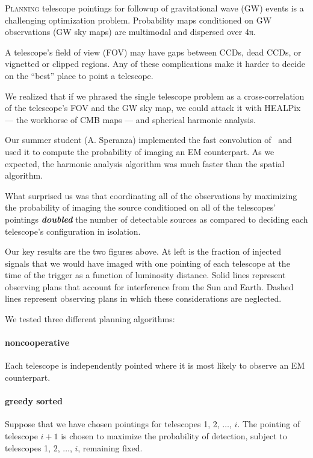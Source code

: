 \documentclass[portrait]{a0poster}
\newcommand{\dropcap}[2]{\lettrine{\fontspec{Copse}#1}{\textnormal{#2}}}
\renewcommand{\emph}[1]{{\bfseries\itshape#1}}
\begin{document}
\dropcap{P}{lanning} telescope pointings for followup of gravitational wave (GW) events is a challenging optimization problem.  Probability maps conditioned on GW observations (GW sky maps) are multimodal and dispersed over 4π.

A telescope’s field of view (FOV) may have gaps between CCDs, dead CCDs, or vignetted or clipped regions.  Any of these complications make it harder to decide on the “best” place to point a telescope.

We realized that if we phrased the single telescope problem as a cross-correlation of the telescope’s FOV and the GW sky map, we could attack it with HEALPix --- the workhorse of CMB maps --- and spherical harmonic analysis.

Our summer student (A. Speranza) implemented the fast convolution of~\citet{Wandelt:2001p13439} and used it to compute the probability of imaging an EM counterpart.  As we expected, the harmonic analysis algorithm was much faster than the spatial algorithm.

What surprised us was that coordinating all of the observations by maximizing the probability of imaging the source conditioned on all of the telescopes’ pointings \emph{doubled} the number of detectable sources as compared to deciding each telescope’s configuration in isolation.

\framebreak

Our key results are the two figures above.  At left is the fraction of injected signals that we would have imaged with one pointing of each telescope at the time of the trigger as a function of luminosity distance.  Solid lines represent observing plans that account for interference from the Sun and Earth.  Dashed lines represent observing plans in which these considerations are neglected.

We tested three different planning algorithms:

\paragraph{\color{red}noncooperative}
Each telescope is independently pointed where it is most likely to observe an EM counterpart.

\paragraph{\color{green!50!black}greedy sorted}
Suppose that we have chosen pointings for telescopes 1, 2, $\dots$, $i$.  The pointing of telescope $i+1$ is chosen to maximize the probability of detection, subject to telescopes 1, 2, $\dots$, $i$, remaining fixed.
\end{document}
